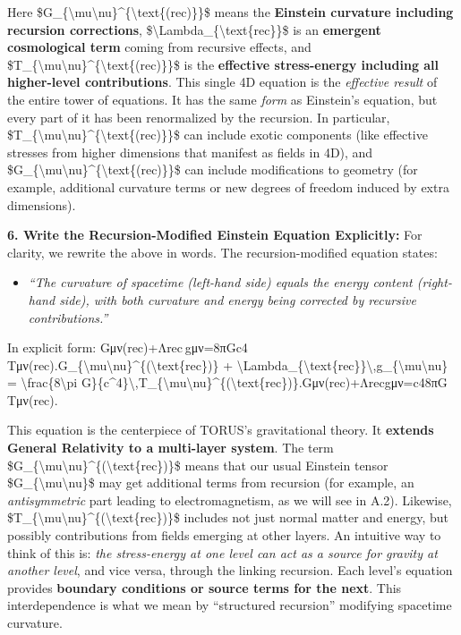 \documentclass[]{article}
\begin{document}
Here
\$G\_\{\textbackslash{}mu\textbackslash{}nu\}\^{}\{\textbackslash{}text\{(rec)\}\}\$
means the \textbf{Einstein curvature including recursion corrections},
\$\textbackslash{}Lambda\_\{\textbackslash{}text\{rec\}\}\$ is an
\textbf{emergent cosmological term} coming from recursive effects, and
\$T\_\{\textbackslash{}mu\textbackslash{}nu\}\^{}\{\textbackslash{}text\{(rec)\}\}\$
is the \textbf{effective stress-energy including all higher-level
contributions}​. This single 4D equation is the \emph{effective result}
of the entire tower of equations. It has the same \emph{form} as
Einstein's equation, but every part of it has been renormalized by the
recursion. In particular,
\$T\_\{\textbackslash{}mu\textbackslash{}nu\}\^{}\{\textbackslash{}text\{(rec)\}\}\$
can include exotic components (like effective stresses from higher
dimensions that manifest as fields in 4D), and
\$G\_\{\textbackslash{}mu\textbackslash{}nu\}\^{}\{\textbackslash{}text\{(rec)\}\}\$
can include modifications to geometry (for example, additional curvature
terms or new degrees of freedom induced by extra dimensions).

\textbf{6. Write the Recursion-Modified Einstein Equation Explicitly:}
For clarity, we rewrite the above in words. The recursion-modified
equation states​:

\begin{itemize}
\item
  \emph{``The curvature of spacetime (left-hand side) equals the energy
  content (right-hand side), with both curvature and energy being
  corrected by recursive contributions.''}
\end{itemize}

In explicit form:
Gμν(rec)+Λrec gμν=8πGc4 Tμν(rec).G\_\{\textbackslash{}mu\textbackslash{}nu\}\^{}\{(\textbackslash{}text\{rec\})\}
+
\textbackslash{}Lambda\_\{\textbackslash{}text\{rec\}\}\textbackslash{},g\_\{\textbackslash{}mu\textbackslash{}nu\}
= \textbackslash{}frac\{8\textbackslash{}pi
G\}\{c\^{}4\}\textbackslash{},T\_\{\textbackslash{}mu\textbackslash{}nu\}\^{}\{(\textbackslash{}text\{rec\})\}.Gμν(rec)​+Λrec​gμν​=c48πG​Tμν(rec)​.

This equation is the centerpiece of TORUS's gravitational theory. It
\textbf{extends General Relativity to a multi-layer system}. The term
\$G\_\{\textbackslash{}mu\textbackslash{}nu\}\^{}\{(\textbackslash{}text\{rec\})\}\$
means that our usual Einstein tensor
\$G\_\{\textbackslash{}mu\textbackslash{}nu\}\$ may get additional terms
from recursion (for example, an \emph{antisymmetric} part leading to
electromagnetism, as we will see in A.2). Likewise,
\$T\_\{\textbackslash{}mu\textbackslash{}nu\}\^{}\{(\textbackslash{}text\{rec\})\}\$
includes not just normal matter and energy, but possibly contributions
from fields emerging at other layers. An intuitive way to think of this
is: \emph{the stress-energy at one level can act as a source for gravity
at another level}, and vice versa, through the linking recursion. Each
level's equation provides \textbf{boundary conditions or source terms
for the next}​. This interdependence is what we mean by ``structured
recursion'' modifying spacetime curvature.
\end{document}
